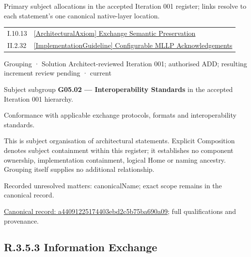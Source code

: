 Primary subject allocations in the accepted Iteration 001 register; links resolve to each statement’s one canonical native-layer location.\par
\begin{longtable}{p{.22\linewidth}p{.73\linewidth}}
I.10.13 & \hyperref[element:602eb50793f448d8bdbc92d41f851877]{[ArchitecturalAxiom] Exchange Semantic Preservation} \\
II.2.32 & \hyperref[element:ab4206c7312449569abaa818b3a8727a]{[ImplementationGuideline] Configurable MLLP Acknowledgements} \\
\end{longtable}
\label{element:a44091225174403ebd2c5b75ba690a09}
{\small Grouping · Solution Architect-reviewed Iteration 001; authorised ADD; resulting increment review pending · current}\par

Subject subgroup \textbf{G05.02 — Interoperability Standards} in the accepted Iteration 001 hierarchy.



Conformance with applicable exchange protocols, formats and interoperability standards.



This is subject organisation of architectural statements. Explicit Composition denotes subject containment within this register; it establishes no component ownership, implementation containment, logical Home or naming ancestry. Grouping itself supplies no additional relationship.


{\small Recorded unresolved matters: canonicalName; exact scope remains in the canonical record.}\par
{\footnotesize \href{../../../../continuum/grouping/a44091225174403ebd2c5b75ba690a09.md}{Canonical record: a44091225174403ebd2c5b75ba690a09}; full qualifications and provenance.}\par
\subsection*{R.3.5.3 Information Exchange}
\label{navigation:R.3.5.3}

